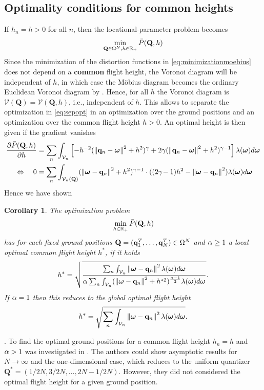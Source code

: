 \documentclass[smallabstract,smallcaptions]{dccpaper}
\newenvironment{remark}{\par\vspace{1.5ex}\noindent{\em Remark\/}.}{\par\vspace{1.5ex}}
\renewcommand{\vp}{\mathbf q}
\renewcommand{\vP}{\mathbf Q}
\newcommand{\df}{\ensuremath{\lam}}         %
\newcommand{\Pbar}{\ensuremath{\bar{P}}}         %
\newcommand{\Vor}{\ensuremath{\mathcal{V}}}         %
\newtheorem{corollary}{Corollary}
\begin{document}
\subsection{Optimality conditions for common heights}

If $h_n=h>0$ for all $n$, then the locational-parameter problem becomes
%
\begin{align}
  \min_{\vP\in\Omega^N,h\in\R_+} \Pbar(\vP,h) \label{eq:sepopt}
\end{align}
% 
Since the minimization of the distortion functions in \eqref{eq:minimizationmoebius}   does not depend on a {\bfseries
common} flight
height, the Voronoi diagram will be independent of $h$, in which case the Möbius diagram becomes the ordinary Euclidean
Voronoi diagram by .
%
Hence, for all $h$ the Voronoi diagram is $\Vor(\vP)=\Vor(\vP,h)$, i.e., independent of $h$. This allows to separate the
optimization in \eqref{eq:sepopt} in an optimization over the ground positions and an optimization over the common
flight height $h>0$. An optimal height is then given if the gradient vanishes
%
\begin{align}
  \frac{\partial \Pbar(\vP,h)}{\partial h} &= \sum_n{\int_{\Vor_n} \left[-h^{-2}(\Norm{\vp_n-\vome}^2 + h^2)^{\gam} + 2\gam 
    (\Norm{\vp_n-\vome}^2 +h^2)^{\gam-1}\right]
    \df(\vome)d \vome} \notag\\
  \LRA\quad 0 &= \sum_n\int_{\Vor_n(\vP)} (\Norm{\vome-\vp_n}^2+h^2)^{\gam-1} \cdot ((2\gam\!-1)h^2 -\Norm{\vome-\vp_n}^2)
  \df(\vome)d \vome
\end{align}
%
Hence we have shown
%
\begin{corollary}
  The optimization problem 
  \begin{align}
    \min_{h\in\R_+} \Pbar(\vP,h)
  \end{align}
  has for each fixed ground positions $\vP=(\vp_1^T,\dots,\vp_N^T)\in\Ome^N$ and $\alpha\geq 1$ a
  local optimal common flight height $h^*$, if it holds
  \begin{align}
     h^* = \sqrt{\frac{ \sum_n \int_{\Vor_n} \Norm{\vome-\vp_n}^2 \df(\vome)d\vome}{\alp\sum_n \int_{\Vor_n}
     (\Norm{\vome-\vp_n}^2+h^{*2})^{\frac{\alp-1}{2}} \df(\vome)d\vome}}.
   \end{align}
   If $\alpha=1$ then this reduces to the global optimal flight height 
   \begin{align}
      h^{*} =  \sqrt{\sum_n \int_{\Vor_n} \Norm{\vome-\vp_n}^2 \df(\vome)d\vome}.
   \end{align}
\end{corollary}
%
\begin{remark}
  To find the optimal ground positions for a common flight height $h_n=h$ and $\alpha>1$ was investigated in
  \cite[Sec.III]{KSS18}.  The authors could show asymptotic results for $N\to\infty$ and the one-dimensional case, which
  reduces to the uniform quantizer $\vP^*=(1/2N,3/2N,\dots,2N-1/2N)$. However, they did not considered the optimal
  flight height for a given ground position.
\end{remark}
 
\end{document}
